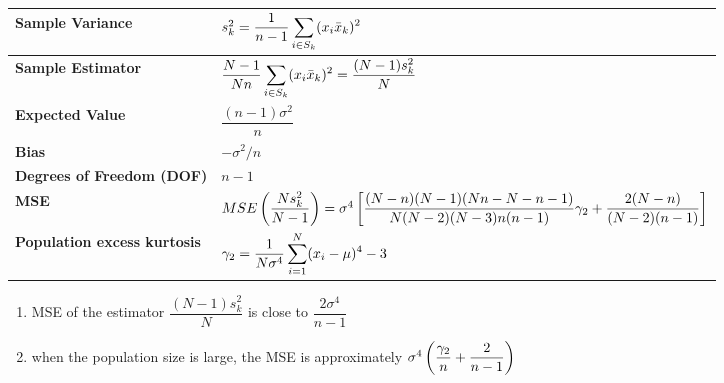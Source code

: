 \begin{customTableWrapper}{1}
\begin{longtable}{|p{2cm}|p{12cm}|}
    \hline

    \textbf{Sample Variance} & \vspace{0.01cm} $
        s_k^2 = \dfrac{1}{n-1}
        \displaystyle\sum_{i\in S_k} (x_i \bar{x}_k)^2
    $ \vspace{0.1cm} \\
    \hline

    \textbf{Sample Estimator} & \vspace{0.01cm} $
        \dfrac{N-1}{Nn} \displaystyle\sum_{i\in S_k}
        (x_i \bar{x}_k)^2
        = \dfrac{(N-1)s_k^2}{N}
    $ \vspace{0.1cm}\\
    \hline

    \textbf{Expected Value} & \vspace{0.01cm} $
        \dfrac{(n-1)\sigma^2}{n}
    $ \vspace{0.1cm} \\
    \hline

    \textbf{Bias} & \vspace{0.01cm} $
        -\sigma^2/n
    $ \vspace{0.1cm} \\
    \hline

    \textbf{Degrees of Freedom (DOF)} & $n-1$\\
    \hline

    \textbf{MSE} & \vspace{0.1cm} $
        MSE\left( \dfrac{Ns_k^2}{N-1} \right)
        = \sigma^4 \left[ 
            \dfrac{
                (N-n)(N-1)(Nn-N-n-1)
            }{
                N(N-2)(N-3)n(n-1)
            }\gamma_2
            + \dfrac{2(N-n)}{(N-2)(n-1)}
        \right]
    $ \vspace{0.1cm} \\
    \hline

    \textbf{Population excess kurtosis} & $
        \gamma_2 = \dfrac{1}{N\sigma^4}
        \displaystyle\sum_{i=1}^{N} (x_i-\mu)^4 - 3
    $\\
    \hline
\end{longtable}
\end{customTableWrapper}

\begin{enumerate}
    \item MSE of the estimator $\dfrac{(N-1)s_k^2}{N}$ is close to $\dfrac{2\sigma^4}{n-1}$

    \item when the population size is large, the MSE is approximately $\sigma^4\left( \dfrac{\gamma_2}{n} + \dfrac{2}{n-1} \right)$
\end{enumerate}


